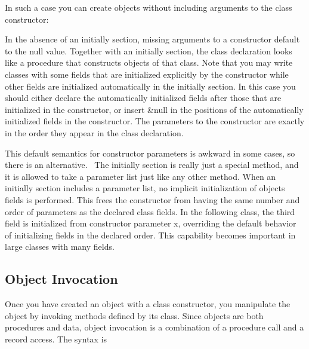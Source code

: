\noindent
In such a case you can create objects without including arguments to the
class constructor: 


In the absence of an \textsf{initially} section, missing arguments to a
constructor default to the null value. Together with an
\textsf{initially} section, the class declaration looks like a
procedure that constructs objects of that class. Note that you may
write classes with some fields that are initialized explicitly by the
constructor while other fields are initialized automatically in the
\textsf{initially} section. In this case you should either declare the
automatically initialized fields after those that are initialized in
the constructor, or insert \textsf{\&null} in the positions of the
automatically initialized fields in the constructor. The parameters to
the constructor are exactly in the order they appear in the class
declaration.

This default semantics for constructor parameters is awkward in some
cases, so there is an alternative. \ The \textsf{initially} section is
really just a special method, and it is allowed to take a parameter
list just like any other method. When an initially section includes a
parameter list, no implicit initialization of objects{\textquotesingle}
fields is performed. This frees the constructor from having the same
number and order of parameters as the declared class fields. In the
following class, the third field is initialized from constructor
parameter \textsf{x}, overriding the default behavior of initializing
fields in the declared order. This capability becomes important in
large classes with many fields.


\subsection{Object Invocation}

Once you have created an object with a class constructor, you manipulate
the object by invoking methods defined by its class. Since objects are
both procedures and data, object invocation is a combination of a procedure call and a record
access. The syntax is

